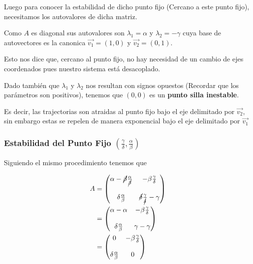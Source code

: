 \documentclass[10pt,journal,compsoc]{IEEEtran}
\begin{document}
 Luego para conocer la estabilidad de dicho punto fijo (Cercano a este punto
 fijo), necesitamos los autovalores de dicha matriz.
 
 Como $A$ es diagonal sus autovalores son $\lambda_1 = \alpha$ y $\lambda_2 =
 -\gamma$ cuya base de autovectores es la canonica $\vec{v_1} = (1, 0)$ y
 $\vec{v_2} = (0, 1)$.

 Esto nos dice que, cercano al punto fijo, no hay necesidad de un cambio de ejes
 coordenados pues nuestro sistema está desacoplado.
 
 Dado también que $\lambda_1$ y $\lambda_2$ nos resultan con signos opuestos
 (Recordar que los parámetros son positivos), tenemos que $(0, 0)$ es un
 \textbf{punto silla inestable}.

 Es decir, las trajectorias son atraidas al punto fijo bajo el eje delimitado
 por $\vec{v_2}$, sin embargo estas se repelen de manera exponencial bajo el eje
 delimitado por $\vec{v_1}$

 \subsubsection{Estabilidad del Punto Fijo $(\frac{\gamma}{\delta},
 \frac{\alpha}{\beta})$}
 
 Siguiendo el mismo procedimiento tenemos que

 \begin{equation*}
  \begin{aligned}
  A &= \begin{pmatrix}
      \alpha - \cancel{\beta} \frac{\alpha}{\cancel{\beta}} & -\beta \frac{\gamma}{\delta}\\
      & \\
      \delta \frac{\alpha}{\beta} & \cancel{\delta} \frac{\gamma}{\cancel{\delta}} - \gamma
    \end{pmatrix} \\
    &= \begin{pmatrix}
      \alpha - \alpha & -\beta \frac{\gamma}{\delta}\\
      & \\
      \delta \frac{\alpha}{\beta} &  \gamma - \gamma
    \end{pmatrix} \\
    &= \begin{pmatrix}
      0 & -\beta \frac{\gamma}{\delta}\\
      & \\
      \delta \frac{\alpha}{\beta} & 0
    \end{pmatrix}
  \end{aligned}
 \end{equation*}
 
\end{document}
